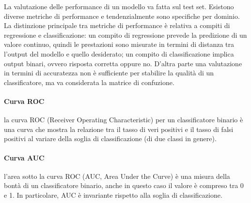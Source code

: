 La valutazione delle performance di un modello va fatta sul test set. Esistono
diverse metriche di performance e tendenzialmente sono specifiche per dominio.
La distinzione principale tra metriche di performance è relativa a compiti di
regressione e classificazione: un compito di regressione prevede la predizione
di un valore continuo, quindi le prestazioni sono misurate in termini di
distanza tra l'output del modello e quello desiderato; un compito di
classificazione implica output binari, ovvero risposta corretta oppure no.
D'altra parte una valutazione in termini di accuratezza non è sufficiente per
stabilire la qualità di un classificatore, ma va considerata la matrice di
confuzione.

\paragraph{Curva ROC} la curva ROC (Receiver Operating Characteristic) per un
classificatore binario è una curva che mostra la relazione tra il tasso di
veri positivi e il tasso di falsi positivi al variare della soglia di
classificazione (di due classi in genere).\\

\paragraph{Curva AUC} l'area sotto la curva ROC (AUC, Area Under the Curve) è
una misura della bontà di un classificatore binario, anche in questo caso il
valore è compreso tra 0 e 1. In particolare, AUC è invariante rispetto alla
soglia di classificazione.
